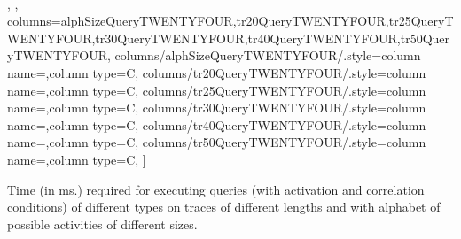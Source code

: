 \begin{tiny}
\begin{table}
\begin{center}
{{{{            \\\midrule
		},
	},
	 columns={alphSizeQueryTWENTYFOUR,tr20QueryTWENTYFOUR,tr25QueryTWENTYFOUR,tr30QueryTWENTYFOUR,tr40QueryTWENTYFOUR,tr50QueryTWENTYFOUR},	 columns/{alphSizeQueryTWENTYFOUR}/.style={column name={},column type=C},	
    columns/{tr20QueryTWENTYFOUR}/.style={column name={},column type=C},
    columns/{tr25QueryTWENTYFOUR}/.style={column name={},column type=C},
	columns/{tr30QueryTWENTYFOUR}/.style={column name={},column type=C},
    columns/{tr40QueryTWENTYFOUR}/.style={column name={},column type=C},
	columns/{tr50QueryTWENTYFOUR}/.style={column name={},column type=C},
]{\fileQueryTWENTYFOUR}
}
}
\caption{Time (in ms.) required for executing queries (with activation and correlation conditions) of different types on traces of different lengths and with alphabet of possible activities of different sizes.}
\label{table:exp_results_real}
\end{center}
\end{table}
\end{tiny} 
